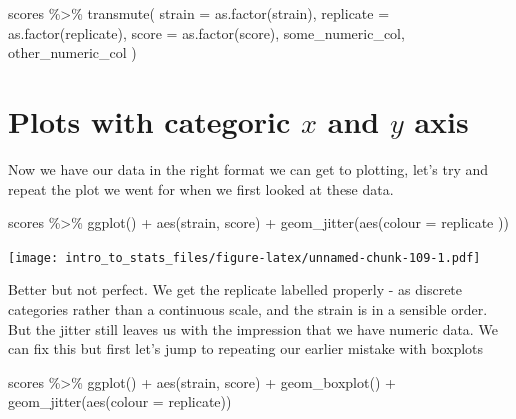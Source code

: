 \documentclass[
]{book}
\newenvironment{Shaded}{\begin{snugshade}}{\end{snugshade}}
\newcommand{\AttributeTok}[1]{\textcolor[rgb]{0.77,0.63,0.00}{#1}}
\newcommand{\FunctionTok}[1]{\textcolor[rgb]{0.00,0.00,0.00}{#1}}
\newcommand{\NormalTok}[1]{#1}
\newcommand{\SpecialCharTok}[1]{\textcolor[rgb]{0.00,0.00,0.00}{#1}}
\begin{document}
\begin{Shaded}
\begin{Highlighting}[]
\NormalTok{scores }\SpecialCharTok{\%\textgreater{}\%} \FunctionTok{transmute}\NormalTok{(}
  \AttributeTok{strain =} \FunctionTok{as.factor}\NormalTok{(strain),}
  \AttributeTok{replicate =} \FunctionTok{as.factor}\NormalTok{(replicate),}
  \AttributeTok{score =} \FunctionTok{as.factor}\NormalTok{(score),}
\NormalTok{  some\_numeric\_col, other\_numeric\_col}
\NormalTok{)}
\end{Highlighting}
\end{Shaded}

\hypertarget{plots-with-categoric-x-and-y-axis}{%
\section{\texorpdfstring{Plots with categoric \(x\) and \(y\) axis}{Plots with categoric x and y axis}}\label{plots-with-categoric-x-and-y-axis}}

Now we have our data in the right format we can get to plotting, let's try and repeat the plot we went for when we first looked at these data.

\begin{Shaded}
\begin{Highlighting}[]
\NormalTok{scores }\SpecialCharTok{\%\textgreater{}\%} \FunctionTok{ggplot}\NormalTok{() }\SpecialCharTok{+}
  \FunctionTok{aes}\NormalTok{(strain, score) }\SpecialCharTok{+}
  \FunctionTok{geom\_jitter}\NormalTok{(}\FunctionTok{aes}\NormalTok{(}\AttributeTok{colour =}\NormalTok{ replicate ))}
\end{Highlighting}
\end{Shaded}

\texttt{[image: intro\_to\_stats\_files/figure-latex/unnamed-chunk-109-1.pdf]}

Better but not perfect. We get the replicate labelled properly - as discrete categories rather than a continuous scale, and the strain is in a sensible order. But the jitter still leaves us with the impression that we have numeric data. We can fix this but first let's jump to repeating our earlier mistake with boxplots

\begin{Shaded}
\begin{Highlighting}[]
\NormalTok{scores }\SpecialCharTok{\%\textgreater{}\%} \FunctionTok{ggplot}\NormalTok{() }\SpecialCharTok{+}
  \FunctionTok{aes}\NormalTok{(strain, score) }\SpecialCharTok{+}
  \FunctionTok{geom\_boxplot}\NormalTok{() }\SpecialCharTok{+}
  \FunctionTok{geom\_jitter}\NormalTok{(}\FunctionTok{aes}\NormalTok{(}\AttributeTok{colour =}\NormalTok{ replicate))}
\end{Highlighting}
\end{Shaded}
\end{document}
